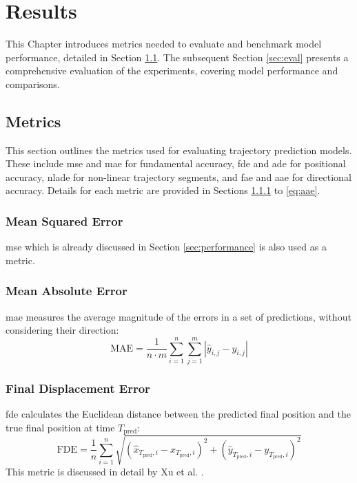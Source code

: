 \chapter{Results}
This Chapter introduces metrics needed to evaluate and benchmark model performance, detailed in Section \ref{sec:metrics}. The subsequent Section \ref{sec:eval} presents a comprehensive evaluation of the experiments, covering model performance and comparisons.

\section{Metrics}
\label{sec:metrics}
This section outlines the metrics used for evaluating trajectory prediction models. These include \gls{mse} and \gls{mae} for fundamental accuracy, \gls{fde} and \gls{ade} for positional accuracy, \gls{nlade} for non-linear trajectory segments, and \gls{fae} and \gls{aae} for directional accuracy. Details for each metric are provided in Sections \ref{eq:mse} to \ref{eq:aae}.

\subsection{Mean Squared Error}
\label{eq:mse}
\gls{mse} which is already discussed in Section \ref{sec:performance} is also used as a metric.

\subsection{Mean Absolute Error}
\label{eq:mae}
\gls{mae} measures the average magnitude of the errors in a set of predictions, without considering their direction:
\begin{equation}
\text{MAE} = \frac{1}{n \cdot m} \sum_{i=1}^n \sum_{j=1}^m \left| \hat{y}_{i,j} - y_{i,j} \right|
\end{equation}
\subsection{Final Displacement Error}
\label{eq:FDE}
\gls{fde} calculates the Euclidean distance between the predicted final position and the true final position at time \(T_{\text{pred}}\):
\begin{equation}
\text{FDE} = \frac{1}{n} \sum_{i=1}^n \sqrt{ (\hat{x}_{T_{\text{pred}},i} - x_{T_{\text{pred}},i})^2 + (\hat{y}_{T_{\text{pred}},i} - y_{T_{\text{pred}},i})^2 }
\end{equation}
This metric is discussed in detail by Xu et al. \cite{xu2018collision}.

